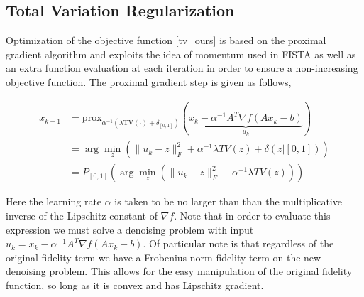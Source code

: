 \documentclass[10pt,a4paper]{article}
\newcommand{\prox}{\mathrm{prox}}
\begin{document}
	\subsection{Total Variation Regularization}
	
	Optimization of the objective function \eqref{tv_ours} is based on the proximal gradient algorithm and exploits the idea of momentum used in FISTA as well as an extra function evaluation at each iteration in order to ensure a non-increasing objective function.  The proximal gradient step is given as follows,
	
	\begin{align*}
	x_{k+1} &= \prox_{\alpha^{-1}(\lambda \textrm{TV}(\cdot) + \delta_{[0,1]})} (\underbrace{x_k - \alpha^{-1} A^T\nabla f (Ax_k - b)}_{u_k}) \\
	&= \arg \min_z \left( \|u_k - z\|_F^2 + \alpha^{-1}\lambda TV(z) + \delta(z | [0,1]) \right) \\
	&= P_{[0,1]}  \left( \arg \min_z \left( \|u_k - z\|_F^2 + \alpha^{-1}\lambda TV(z) \right) \right)
	\end{align*}
	
	Here the learning rate $\alpha$ is taken to be no larger than than the multiplicative inverse of the Lipschitz constant of $\nabla f$.  Note that in order to evaluate this expression we must solve a denoising problem with input $u_k = x_k - \alpha^{-1} A^T\nabla f (Ax_k - b)$.  Of particular note is that regardless of the original fidelity term we have a Frobenius norm fidelity term on the new denoising problem.  This allows for the easy manipulation of the original fidelity function, so long as it is convex and has Lipschitz gradient.
	
\end{document}
